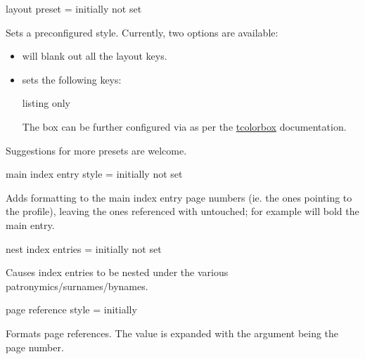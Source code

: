 \documentclass[
	a4paper,
]{article}
\begin{document}
\begin{docKey}
	{layout preset}
	{=}
	{initially not set}

	Sets a preconfigured style. Currently, two options are available:

	\begin{itemize}
		\item {} will blank out all the layout keys.

		\item {} sets the following keys:

		\begin{tcblisting}{listing only}
		\end{tcblisting}

		The box can be further configured via  as per the \href{https://ctan.org/pkg/tcolorbox}{tcolorbox} documentation.

	\end{itemize}

	Suggestions for more presets are welcome.

\end{docKey}

\begin{docKey}
	{main index entry style}
	{=}
	{initially not set}

	Adds formatting to the main index entry page numbers (ie. the ones pointing to the profile), leaving the ones referenced with  untouched; for example  will bold the main entry.
\end{docKey}

\begin{docKey}
	{nest index entries}
	{=}
	{initially not set}

	Causes index entries to be nested under the various patronymics/surnames/bynames.
\end{docKey}

\begin{docKey}
	{page reference style}
	{=}
	{initially }

	Formats page references. The value is expanded with the argument  being the page number.
\end{docKey}
\end{document}
